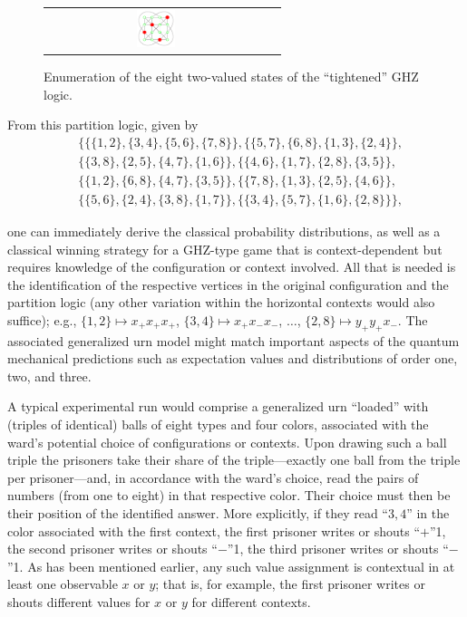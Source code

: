 \documentclass[sn-mathphys]{sn-jnl}%
\theoremstyle{thmstyleone}%
\theoremstyle{thmstyletwo}%
\theoremstyle{thmstylethree}%
\begin{document}
\begin{figure}[h]
\begin{center}
\begin{tabular}{ c c c c}
&
\includegraphics[width=0.2\textwidth]{2020-ghz-exfigures-figure10}
\end{tabular}
\end{center}
\caption{\label{2020-f-ghz-contextghz2vs}
Enumeration of the eight two-valued states of the ``tightened'' GHZ logic.
}
\end{figure}

From this partition logic, given by
\begin{equation}
\begin{aligned}
&\{ \{
\{1,2\},\{3,4\},\{5,6\},\{7,8\}
\},\{
\{5,7\},\{6,8\},\{1,3\},\{2,4\}
\},\\
&\{
\{3,8\},\{2,5\},\{4,7\},\{1,6\}
\},\{
\{4,6\},\{1,7\},\{2,8\},\{3,5\}
\},\\
&\{
\{1,2\},\{6,8\},\{4,7\},\{3,5\}
\},\{
\{7,8\},\{1,3\},\{2,5\},\{4,6\}
\},\\
&\{
\{5,6\},\{2,4\},\{3,8\},\{1,7\}
\},\{
\{3,4\},\{5,7\},\{1,6\},\{2,8\}
\}
\}
,
\end{aligned}
\label{2020-ghz-e-pl}
\end{equation}

one can immediately derive the classical probability distributions,
as well as a classical winning strategy for a GHZ-type game that is context-dependent but requires knowledge of the configuration or context involved.
All that is needed is the identification of the respective vertices in the original configuration and the partition logic
(any other variation within the horizontal contexts would also suffice);
e.g.,
$\{1,2\} \mapsto x_+x_+x_+$,
$\{3,4\} \mapsto x_+x_-x_-$, $\ldots$,
$\{2,8\} \mapsto y_+y_+x_-$.
The associated generalized urn model might match important aspects of the quantum mechanical predictions such as expectation values and distributions of order one, two, and three.

A typical experimental run would comprise a generalized urn ``loaded'' with (triples of identical) balls of eight types and four colors, associated with
the ward's potential choice of configurations or contexts.
Upon drawing such a ball triple the prisoners take their share of the triple---exactly one ball from the triple per prisoner---and, in accordance with the ward's choice,
read the pairs of numbers (from one to eight) in that respective color. Their choice must then be their position of the identified answer.
More explicitly, if they read ``$3,4$'' in the color associated with the first context,
the first prisoner writes or shouts ``$+$''1,
the second prisoner writes or shouts ``$-$''1,
the third prisoner writes or shouts ``$-$''1.
As has been mentioned earlier, any such value assignment is contextual in at least one observable $x$ or $y$; that is, for example, the first prisoner writes or shouts
different values for $x$ or $y$ for different contexts.
\end{document}
